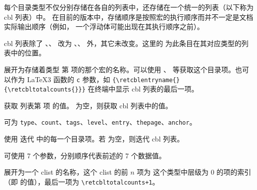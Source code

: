\documentclass[twoside]{book}
\begin{document}
每个目录类型不仅分别存储在各自的列表中，还存储在一个统一的列表（以下称为 cbl 列表）中。
在目前的版本中，存储顺序是按照宏的执行顺序而并不一定是文档实际输出顺序（例如，
一个浮动体可能出现在其执行顺序之前）。

cbl 列表除了 、、
 改为 、、
 外，其它未改变。这里的  为此条目在其对应类型的列表中的位置。

\begin{function}[EXP]{\retcblentryname}
  \begin{syntax}
    \V\retcblentryname {} 
  \end{syntax}
展开为存储着类型  第  项的那个宏的名称。可以使用 、\linebreak
{} 等获取这个目录项。也可以作为 \LaTeX3 函数的 \texttt{c} 参数，如  \verb|{\retcblentryname{}{\retcbltotalcounts{}}}| 在终端中显示 cbl 列表的最后一项。
\end{function}

\begin{function}[EXP]{\retcblentrydata}
  \begin{syntax}
    \V\retcblentrydata {}  
  \end{syntax}
获取  列表第  项  的值。 为空，则获取 cbl 列表中的值。

 可为 \texttt{type}、\texttt{count}、\texttt{tags}、\texttt{level}、\texttt{entry}、\texttt{thepage}、\texttt{anchor}。
\end{function}

\begin{function}{\iteratecontents}
  \begin{syntax}
    \V\iteratecontents {} 
  \end{syntax}
使用  迭代  中的每一个目录项。若  为空，则迭代 cbl 列表。

 可使用 7 个参数，分别顺序代表前述的 7 个数据值。
\end{function}

\begin{function}[EXP]{\retcbldefaultlevellistname}
  \begin{syntax}
    \V\retcbldefaultlevellistname {}
  \end{syntax}
展开为一个 clist 的名称，这个 clist 的前 $n$ 项为  这个类型中层级为 0 的项的索引（即  的值），最后一项为 \verb|\retcbltotalcounts|\verb|+1|。
\end{function}
\end{document}
